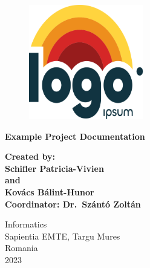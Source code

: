 \begin{titlepage}
    \begin{center}
        \vspace*{1cm}

        \begin{figure}[h]
            \includegraphics[width=5cm]{assets/project-logo.png}
            \centering
        \end{figure}

        \Huge
        \textbf{Example Project Documentation}

        \vspace{1.5cm}
        \large
        \textbf{Created by: \\ Schifler Patricia-Vivien \\ and \\ Kovács Bálint-Hunor \\}
        \vspace{0.8cm}
        \textbf{Coordinator: Dr.\ Szántó Zoltán}

        \vfill
        \Large
        Informatics\\
        Sapientia EMTE, Targu Mures\\
        Romania\\
        2023

    \end{center}
\end{titlepage}
